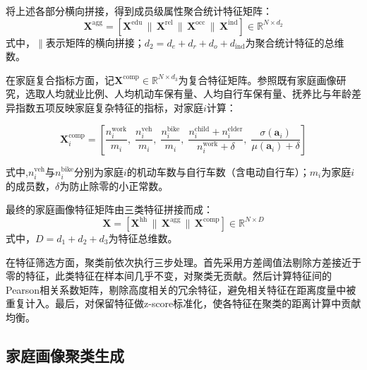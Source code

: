将上述各部分横向拼接，得到成员级属性聚合统计特征矩阵：
\begin{equation}
  \mathbf{X}^{\text{agg}} = \left[ \mathbf{X}^{\text{edu}} \,\|\, \mathbf{X}^{\text{rel}} \,\|\, \mathbf{X}^{\text{occ}} \,\|\, \mathbf{X}^{\text{ind}} \right] \in \mathbb{R}^{N \times d_2}
  \label{eq.popsyn.xagg}
\end{equation}
式中，$\|$表示矩阵的横向拼接；$d_2 = d_e + d_r + d_o + d_{\text{ind}}$为聚合统计特征的总维数。
 
在家庭复合指标方面，记$\mathbf{X}^{\text{comp}} \in \mathbb{R}^{N \times d_3}$为复合特征矩阵。参照既有家庭画像研究\cite{kingDemographicHealthEconomic2021,varjakoskiAgeDiversityNeighborhoods2023,zhangExaminingRelationshipHousehold2018,nakayamaComparingHouseholdsEvery2023}，选取人均就业比例、人均机动车保有量、人均自行车保有量、抚养比与年龄差异指数五项反映家庭复杂特征的指标，对家庭$i$计算：

\begin{equation}
  \mathbf{X}^{\text{comp}}_i = \left[ \frac{n^{\text{work}}_i}{m_i},\; \frac{n^{\text{veh}}_i}{m_i},\; \frac{n^{\text{bike}}_i}{m_i},\; \frac{n^{\text{child}}_i + n^{\text{elder}}_i}{n^{\text{work}}_i + \delta},\; \frac{\sigma(\mathbf{a}_i)}{\mu(\mathbf{a}_i) + \delta} \right]
  \label{eq.popsyn.xcomp}
\end{equation}

\noindent 式中,$n^{\text{veh}}_i$与$n^{\text{bike}}_i$分别为家庭$i$的机动车数与自行车数（含电动自行车）；$m_i$为家庭$i$的成员数，$\delta$为防止除零的小正常数。
 
最终的家庭画像特征矩阵由三类特征拼接而成：
\begin{equation}
  \mathbf{X} = \left[ \mathbf{X}^{\text{hh}} \,\|\, \mathbf{X}^{\text{agg}} \,\|\, \mathbf{X}^{\text{comp}} \right] \in \mathbb{R}^{N \times D}
  \label{eq.popsyn.xfull}
\end{equation}
式中，$D = d_1 + d_2 + d_3$为特征总维数。
 
在特征筛选方面，聚类前依次执行三步处理。首先采用方差阈值法剔除方差接近于零的特征，此类特征在样本间几乎不变，对聚类无贡献。然后计算特征间的Pearson相关系数矩阵，剔除高度相关的冗余特征，避免相关特征在距离度量中被重复计入。最后，对保留特征做z-score标准化，使各特征在聚类的距离计算中贡献均衡。
 
\subsection{家庭画像聚类生成}\label{subsec.popsyn.segment.cluster}
 
